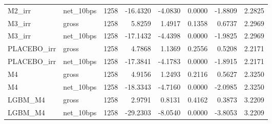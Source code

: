 \begin{tabular}{llrrrrrr}
M2\_irr & net\_10bps & 1258 & -16.4320 & -4.0830 & 0.0000 & -1.8809 & 2.2825 \\
M3\_irr & gross & 1258 & 5.8259 & 1.4917 & 0.1358 & 0.6737 & 2.2969 \\
M3\_irr & net\_10bps & 1258 & -17.1432 & -4.4398 & 0.0000 & -1.9825 & 2.2969 \\
PLACEBO\_irr & gross & 1258 & 4.7868 & 1.1369 & 0.2556 & 0.5208 & 2.2171 \\
PLACEBO\_irr & net\_10bps & 1258 & -17.3841 & -4.1783 & 0.0000 & -1.8915 & 2.2171 \\
M4 & gross & 1258 & 4.9156 & 1.2493 & 0.2116 & 0.5627 & 2.3250 \\
M4 & net\_10bps & 1258 & -18.3343 & -4.7160 & 0.0000 & -2.0985 & 2.3250 \\
LGBM\_M4 & gross & 1258 & 2.9791 & 0.8131 & 0.4162 & 0.3873 & 3.2209 \\
LGBM\_M4 & net\_10bps & 1258 & -29.2303 & -8.0540 & 0.0000 & -3.8053 & 3.2209 \\
\bottomrule
\end{tabular}
